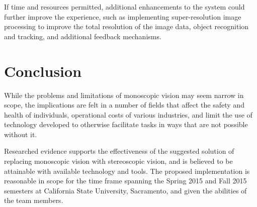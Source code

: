 \documentclass[12pt, journal]{IEEEtran}
\begin{document}
If time and resources permitted, additional enhancements to the system could further improve the experience, such as implementing super-resolution image processing to improve the total resolution of the image data, object recognition and tracking, and additional feedback mechanisms.


\section{Conclusion}
While the problems and limitations of monoscopic vision may seem narrow in scope, the implications are felt in a number of fields that affect the safety and health of individuals, operational costs of various industries, and limit the use of technology developed to otherwise facilitate tasks in ways that are not possible without it.

Researched evidence supports the effectiveness of the suggested solution of replacing monoscopic vision with stereoscopic vision, and is believed to be attainable with available technology and tools.  The proposed implementation is reasonable in scope for the time frame spanning the Spring 2015 and Fall 2015 semesters at California State University, Sacramento, and given the abilities of the team members.



%
\end{document}
